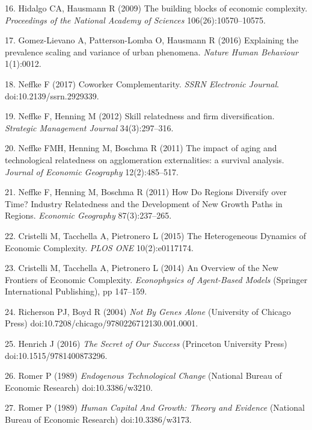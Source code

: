 \documentclass{pnastwo}
\begin{document}
\begin{article}
\label{csl:16}16. Hidalgo CA, Hausmann R (2009) {The building blocks of economic complexity}. \textit{Proceedings of the National Academy of Sciences} 106(26):10570–10575.

\label{csl:17}17. Gomez-Lievano A, Patterson-Lomba O, Hausmann R (2016) {Explaining the prevalence scaling and variance of urban phenomena}. \textit{Nature Human Behaviour} 1(1):0012.

\label{csl:18}18. Neffke F (2017) {Coworker Complementarity}. \textit{{SSRN} Electronic Journal}. doi:10.2139/ssrn.2929339.

\label{csl:19}19. Neffke F, Henning M (2012) {Skill relatedness and firm diversification}. \textit{Strategic Management Journal} 34(3):297–316.

\label{csl:20}20. Neffke FMH, Henning M, Boschma R (2011) {The impact of aging and technological relatedness on agglomeration externalities: a survival analysis}. \textit{Journal of Economic Geography} 12(2):485–517.

\label{csl:21}21. Neffke F, Henning M, Boschma R (2011) {How Do Regions Diversify over Time? Industry Relatedness and the Development of New Growth Paths in Regions}. \textit{Economic Geography} 87(3):237–265.

\label{csl:22}22. Cristelli M, Tacchella A, Pietronero L (2015) {The Heterogeneous Dynamics of Economic Complexity}. \textit{{PLOS} {ONE}} 10(2):e0117174.

\label{csl:23}23. Cristelli M, Tacchella A, Pietronero L (2014) {An Overview of the New Frontiers of Economic Complexity}. \textit{Econophysics of Agent-Based Models} (Springer International Publishing), pp 147–159.

\label{csl:24}24. Richerson PJ, Boyd R (2004) \textit{{Not By Genes Alone}} (University of Chicago Press) doi:10.7208/chicago/9780226712130.001.0001.

\label{csl:25}25. Henrich J (2016) \textit{{The Secret of Our Success}} (Princeton University Press) doi:10.1515/9781400873296.

\label{csl:26}26. Romer P (1989) \textit{{Endogenous Technological Change}} (National Bureau of Economic Research) doi:10.3386/w3210.

\label{csl:27}27. Romer P (1989) \textit{{Human Capital And Growth: Theory and Evidence}} (National Bureau of Economic Research) doi:10.3386/w3173.


\end{article}
\end{document}
